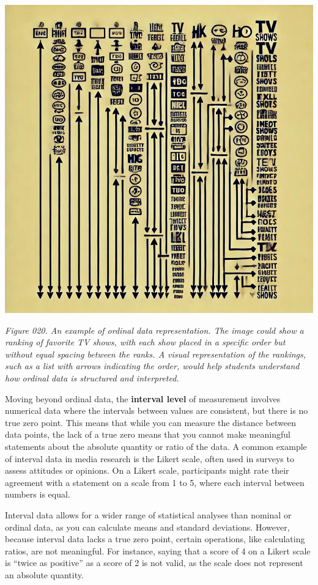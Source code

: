\documentclass[
]{book}
\begin{document}
\includegraphics[width=1\textwidth,height=\textheight]{images/fig020.jpg}

\emph{Figure 020. An example of ordinal data representation. The image could show a ranking of favorite TV shows, with each show placed in a specific order but without equal spacing between the ranks. A visual representation of the rankings, such as a list with arrows indicating the order, would help students understand how ordinal data is structured and interpreted.}

Moving beyond ordinal data, the \textbf{interval level} of measurement involves numerical data where the intervals between values are consistent, but there is no true zero point. This means that while you can measure the distance between data points, the lack of a true zero means that you cannot make meaningful statements about the absolute quantity or ratio of the data. A common example of interval data in media research is the Likert scale, often used in surveys to assess attitudes or opinions. On a Likert scale, participants might rate their agreement with a statement on a scale from 1 to 5, where each interval between numbers is equal.

Interval data allows for a wider range of statistical analyses than nominal or ordinal data, as you can calculate means and standard deviations. However, because interval data lacks a true zero point, certain operations, like calculating ratios, are not meaningful. For instance, saying that a score of 4 on a Likert scale is ``twice as positive'' as a score of 2 is not valid, as the scale does not represent an absolute quantity.
\end{document}
